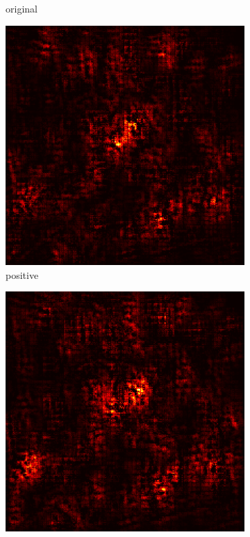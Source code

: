 \documentclass[preprint,12pt]{elsarticle}
\begin{document}
\begin{figure}
\begin{subfigure}{0.14\linewidth}
        \caption{original}
    \end{subfigure}
    \hfill
    \begin{subfigure}{0.14\textwidth}
        \centering
        \includegraphics[width=\linewidth]{../visualizations/examples/imagenette/cnn/positive_saliency_map/0.png}
        \caption{positive}
    \end{subfigure}
    \hfill
    \begin{subfigure}{0.14\textwidth}
        \centering
        \includegraphics[width=\linewidth]{../visualizations/examples/imagenette/cnn/negative_saliency_map/0.png}

\end{subfigure}
\end{figure}
\end{document}
